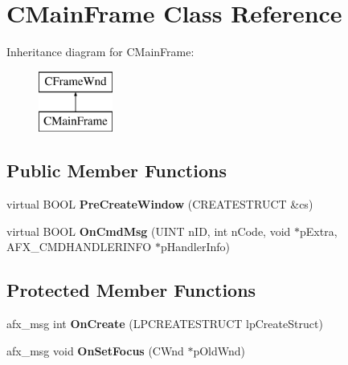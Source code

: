 \hypertarget{class_c_main_frame}{}\section{C\+Main\+Frame Class Reference}
\label{class_c_main_frame}
Inheritance diagram for C\+Main\+Frame\+:\begin{figure}[H]
\begin{center}
\leavevmode
\includegraphics[height=2.000000cm]{class_c_main_frame}
\end{center}
\end{figure}
\subsection*{Public Member Functions}
\begin{DoxyCompactItemize}
\item 
\mbox{\label{class_c_main_frame_a549bf677c955c2898c3c683321633c16}} 
virtual B\+O\+OL {\bfseries Pre\+Create\+Window} (C\+R\+E\+A\+T\+E\+S\+T\+R\+U\+CT \&cs)
\item 
\mbox{\label{class_c_main_frame_ade959eb0bab719bf06bb9b18ee407101}} 
virtual B\+O\+OL {\bfseries On\+Cmd\+Msg} (U\+I\+NT n\+ID, int n\+Code, void $\ast$p\+Extra, A\+F\+X\+\_\+\+C\+M\+D\+H\+A\+N\+D\+L\+E\+R\+I\+N\+FO $\ast$p\+Handler\+Info)
\end{DoxyCompactItemize}
\subsection*{Protected Member Functions}
\begin{DoxyCompactItemize}
\item 
\mbox{\label{class_c_main_frame_a48666466fd37412fcaeff75c3b12e0ed}} 
afx\+\_\+msg int {\bfseries On\+Create} (L\+P\+C\+R\+E\+A\+T\+E\+S\+T\+R\+U\+CT lp\+Create\+Struct)
\item 
\mbox{\label{class_c_main_frame_adc353a3d1fc497fbc009b6d9e6914a82}} 
afx\+\_\+msg void {\bfseries On\+Set\+Focus} (C\+Wnd $\ast$p\+Old\+Wnd)
\end{DoxyCompactItemize}
